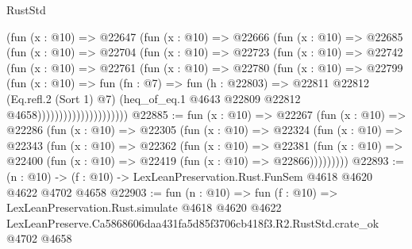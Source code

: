 \begin{lexlean}{RustStd}
\begin{coremodule}
                        (fun (x : @10) =>
                        @22647
                          (fun (x : @10) =>
                          @22666
                            (fun (x : @10) =>
                            @22685
                              (fun (x : @10) =>
                              @22704
                                (fun (x : @10) =>
                                @22723
                                  (fun (x : @10) =>
                                  @22742
                                    (fun (x : @10) =>
                                    @22761
                                      (fun (x : @10) =>
                                      @22780
                                        (fun (x : @10) =>
                                        @22799
                                          (fun (x : @10) =>
                                          fun (fn : @7) =>
                                          fun (h : @22803) =>
                                          @22811
                                            @22812
                                            (Eq.refl.{2} (Sort 1) @7)
                                            (heq_of_eq.{1}
                                              @4643
                                              @22809
                                              @22812
                                              @4658)))))))))))))))))))))
@22885 := fun (x : @10) =>
  @22267
    (fun (x : @10) =>
    @22286
      (fun (x : @10) =>
      @22305
        (fun (x : @10) =>
        @22324
          (fun (x : @10) =>
          @22343
            (fun (x : @10) =>
            @22362
              (fun (x : @10) =>
              @22381
                (fun (x : @10) => @22400 (fun (x : @10) => @22419 (fun (x : @10) => @22866)))))))))
@22893 := (n : @10) -> (f : @10) -> LexLeanPreservation.Rust.FunSem @4618 @4620 @4622 @4702 @4658
@22903 := fun (n : @10) =>
  fun (f : @10) =>
  LexLeanPreservation.Rust.simulate
    @4618
    @4620
    @4622
    LexLeanPreserve.Ca5868606daa431fa5d85f3706cb418f3.R2.RustStd.crate_ok
    @4702
    @4658
\end{coremodule}
\end{lexlean}
